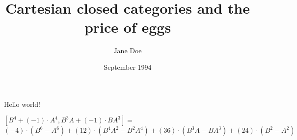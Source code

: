 \documentclass{article}
\title{Cartesian closed categories and the price of eggs}
\author{Jane Doe}
\date{September 1994}
\begin{document}
   \maketitle
   Hello world!

$[B^{4} + 
(-1){\cdot}A^{4},B^{3}A + 
(-1){\cdot}BA^{3}] = $
$(-4){\cdot}(B^{6}-A^{6}) + (12){\cdot}(B^{4}A^{2}-B^{2}A^{4}) + (36){\cdot}(B^{3}A-BA^{3}) + (24){\cdot}(B^{2}-A^{2})$





\end{document}
